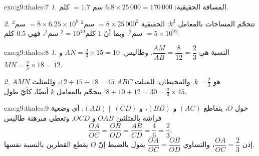 \begin{solution}{exo:g9:thales:7}
\emph{1.} المسافة الحقيقية: $6.8 \times 25\,000 = 170\,000$ سم $=
1.7$ كلم.

\emph{2.} تتحجّم المساحات بالمعامل $k^2$:  الحقيقية
$= 8 \times 25\,000^2$ سم$^2$ $= 8 \times 6.25 \times 10^8$ سم$^2$
$= 5 \times 10^9$ سم$^2$. وبما أنّ $1$ كلم$^2 = 10^{10}$ سم$^2$، فهي $0.5$ كلم$^2$.
\end{solution}

\begin{solution}{exo:g9:thales:8}
\emph{1.} النسبة هي $\dfrac{AM}{AB} = \dfrac{8}{12} = \dfrac23$.
وطاليس: $AN = \frac23 \times 15 = 10$ و $MN = \frac23 \times 18 = 12$.

\emph{2.}  هو $k = \frac23$. والمحيطان: للمثلث $ABC$
 $12 + 15 + 18 = 45$، وللمثلث $AMN$  $8 + 10 + 12 = 30 = \frac23 \times
45$:  يتحجّم بالمعامل $k$ أيضًا، كأيّ طول.
\end{solution}

\begin{solution}{exo:g9:thales:9}
حول $O$، يتقاطع  $(AC)$ و $(BD)$،
و $(AB) \parallel (CD)$: أي وضعية فراشة بالمثلثين $OAB$
و $OCD$. وتعطي مبرهنة طاليس
\[
\frac{OA}{OC} = \frac{OB}{OD} = \frac{AB}{CD} = \frac46 = \frac23 .
\]
إذن $\dfrac{OA}{OC} = \dfrac23$، والتساوي
$\dfrac{OA}{OC} = \dfrac{OB}{OD}$ يقول بالضبط إنّ $O$ يقطع
القطرين بالنسبة نفسها.
\end{solution}

